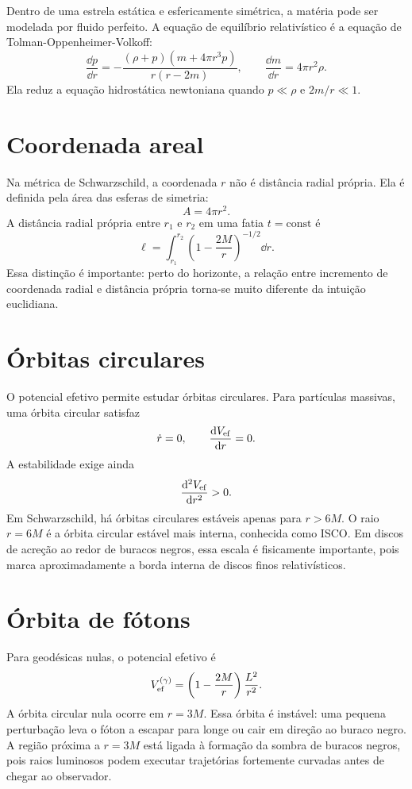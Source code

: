 \documentclass[12pt,a4paper,oneside]{book}
\theoremstyle{rgplain}
\theoremstyle{rgremark}
\begin{document}
Dentro de uma estrela estática e esfericamente simétrica, a matéria pode ser
modelada por fluido perfeito. A equação de equilíbrio relativístico é a
equação de Tolman-Oppenheimer-Volkoff:
\[
  \frac{\dd p}{\dd r}
  =
  -\frac{(\rho+p)(m+4\pi r^3p)}{r(r-2m)},
  \qquad
  \frac{\dd m}{\dd r}=4\pi r^2\rho.
\]
Ela reduz a equação hidrostática newtoniana quando $p\ll\rho$ e $2m/r\ll1$.

\section{Coordenada areal}
\label{sec:coordenada-areal}

Na métrica de Schwarzschild, a coordenada $r$ não é distância radial própria.
Ela é definida pela área das esferas de simetria:
\[
  A=4\pi r^2.
\]
A distância radial própria entre $r_1$ e $r_2$ em uma fatia $t=\mathrm{const}$
é
\[
  \ell=\int_{r_1}^{r_2}
  \left(1-\frac{2M}{r}\right)^{-1/2}\dd r.
\]
Essa distinção é importante: perto do horizonte, a relação entre incremento de
coordenada radial e distância própria torna-se muito diferente da intuição
euclidiana.

\section{Órbitas circulares}

O potencial efetivo permite estudar órbitas circulares. Para partículas
massivas, uma órbita circular satisfaz
\[
  \dot r=0,\qquad \frac{\mathrm{d} V_{\mathrm{ef}}}{\mathrm{d} r}=0.
\]
A estabilidade exige ainda
\[
  \frac{\mathrm{d}^2 V_{\mathrm{ef}}}{\mathrm{d} r^2}>0.
\]
Em Schwarzschild, há órbitas circulares estáveis apenas para $r>6M$. O raio
$r=6M$ é a órbita circular estável mais interna, conhecida como ISCO. Em discos
de acreção ao redor de buracos negros, essa escala é fisicamente importante,
pois marca aproximadamente a borda interna de discos finos relativísticos.

\section{Órbita de fótons}

Para geodésicas nulas, o potencial efetivo é
\[
  V_{\mathrm{ef}}^{(\gamma)}=
  \left(1-\frac{2M}{r}\right)\frac{L^2}{r^2}.
\]
A órbita circular nula ocorre em $r=3M$. Essa órbita é instável: uma pequena
perturbação leva o fóton a escapar para longe ou cair em direção ao buraco
negro. A região próxima a $r=3M$ está ligada à formação da sombra de buracos
negros, pois raios luminosos podem executar trajetórias fortemente curvadas
antes de chegar ao observador.
\end{document}

